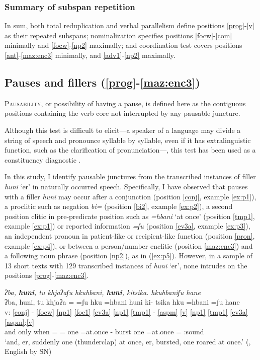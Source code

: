 \documentclass[output=paper]{langscibook}
\begin{document}
\subsubsection{Summary of subspan repetition}
In sum, both total reduplication and verbal parallelism define positions \ref{prog}-\ref{v} as their repeated subspans; nominalization specifies positions \ref{focw}-\ref{com} minimally and \ref{focw}-\ref{np2} maximally; and coordination test covers positions \ref{ant}-\ref{maz:enc3} minimally, and \ref{adv1}-\ref{np2} maximally.

\subsection{Pauses and fillers (\ref{prog}-\ref{maz:enc3})}\label{sec:d:pause}
\textsc{Pausability}, or possibility of having a pause, is defined here as the contiguous positions containing the verb core not interrupted by any pausable juncture.

Although this test is difficult to elicit—a speaker of a language may divide a string of speech and pronounce syllable by syllable, even if it has extralinguistic function, such as the clarification of pronunciation—, this test has been used as a constituency diagnostic \citep[cf.][609]{gerdts14}.

In this study, I identify pausable junctures from the transcribed instances of filler \textit{hu\1ni\2} `er' in naturally occurred speech. Specifically, I have observed that pauses with a filler \textit{hu\1ni\2} may occur after a conjunction (position \ref{conj}, example \ref{ex:p1}), a proclitic such as negation \textit{bi\4=} (position \ref{bi2}, example \ref{ex:p2}), a second position clitic in pre-predicate position such as \textit{=hba\4ni\2\3} `at once' (position \ref{tmp1}, example \ref{ex:p1}) or reported information \textit{=ʃu\3\ff} (position \ref{ev3a}, example \ref{ex:p3}), an independent pronoun in patient-like or recipient-like function (position \ref{pron}, example \ref{ex:p4}), or between a person/number enclitic (position \ref{maz:enc3}) and a following noun phrase (position \ref{np2}), as in (\ref{ex:p5}). However, in a sample of 13 short texts with 129 transcribed instances of \textit{hu\1ni\2} `er', none intrudes on the positions \ref{prog}-\ref{maz:enc3}.

\ea 
\ea \label{ex:p1} \textit{ʔba\1, \textbf{hu\1ni\2}, tu\1 khja\2\st{}ʔa\4\3ʃu\3 \st{}h\ssn{}ku\2\3hba\4ni\2\3, \textbf{hu\1ni\2}, ki\4tsi\2\st{}\ssn{}ka\4. \st{}h\ssn{}ku\2hba\4ni\2\3ʃu\3 ha\2\st{}ne\4}\\
 \glll {} ʔba\1, hu\1ni\2, tu\1 khja\2ʔa\4 =\3\ff{} =ʃu\3\ff{} h\ssn{}ku\2\3 =hba\4ni\2\3 hu\1ni\2 ki\4- tsi\2\ssn{}ka\4 h\ssn{}ku\2 =hba\4ni\2\3 =ʃu\3\ff{} ha\2ne\4 \\
 v: \ref{conj} - \ref{focw} \ref{np1} \ref{foc1} \ref{ev3a} \ref{np1} \ref{tmp1} - \ref{aspm} \ref{v} \ref{np1} \ref{tmp1} \ref{ev3a} \ref{aspm}:\ref{v}\\
{} and \Fill{} only when =\Foc{} =\Rep{} one =at.once \Fill{} \Pfv- burst one =at.once =\Rep{} \Pfv:sound\\
\glt `and, er, suddenly one (thunderclap) at once, er, bursted, one roared at once.' (\citealt[138]{sanchez20}, English by SN)
\end{document}
